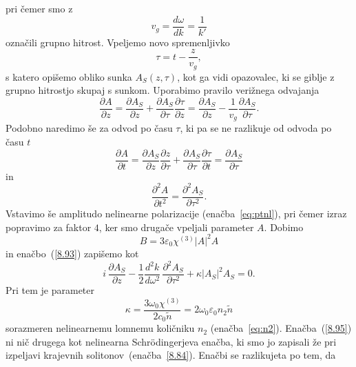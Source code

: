 pri čemer smo z 
\begin{equation}
 v_g = \frac{d\omega}{dk} = \frac{1}{k'}
\end{equation}
označili grupno hitrost.
Vpeljemo novo spremenljivko 
\begin{equation}
\tau=t-\frac{z}{v_{g}},
\label{nelinver}
\end{equation}
s katero opišemo obliko sunka $A_S(z,\tau)$, kot ga vidi opazovalec, ki se giblje
z grupno hitrostjo skupaj s sunkom. Uporabimo pravilo verižnega odvajanja 
\begin{equation}
\frac{\partial A}{\partial z} = \frac{\partial A_S}{\partial z} + \frac{\partial A_S}{\partial \tau}
\frac{\partial \tau}{\partial z}
= \frac{\partial A_S}{\partial z} -\frac{1}{v_g} \frac{\partial A_S}{\partial \tau}.
\end{equation}
Podobno naredimo še za odvod po času $\tau$, ki pa se ne razlikuje od odvoda po času $t$
\begin{equation}
\frac{\partial A}{\partial t} = \frac{\partial A_S}{\partial z}\frac{\partial z}{\partial \tau}+
\frac{\partial A_S}{\partial \tau}\frac{\partial \tau}{\partial t} 
= \frac{\partial A_S}{\partial \tau} 
\end{equation}
in
\begin{equation}
\frac{\partial^2 A}{\partial t^2} = \frac{\partial^2 A_S}{\partial\tau^2}.
\end{equation}
Vstavimo še amplitudo nelinearne polarizacije (enačba~\ref{eq:ptnl}), pri čemer izraz popravimo
za faktor $4$, ker smo drugače vpeljali parameter $A$. Dobimo
\begin{equation}
B = 3\varepsilon_0\chi^{(3)} |A|^2 A
\end{equation}
in enačbo~(\ref{8.93}) zapišemo kot 
\begin{equation}
i\,\frac{\partial A_S}{\partial z}-\frac{1}{2}\frac{d^{2}k}{d\omega^{2}}\,
\frac{\partial^{2}A_S}{\partial\tau^{2}}+\kappa\left|A_S\right|^{2}A_S=0.
\label{8.95}
\end{equation}
Pri tem je parameter
\begin{equation}
\kappa = \frac{3\omega_0\chi^{(3)}}{2c_0 \tilde{n}} = 2 \omega_0 \varepsilon_0 n_2 \tilde{n}
\end{equation}
sorazmeren nelinearnemu lomnemu količniku $n_2$ 
(enačba~\ref{eq:n2}). Enačba~(\ref{8.95}) ni nič drugega kot nelinearna Schr\"odingerjeva 
enačba, ki smo jo 
zapisali že pri izpeljavi krajevnih solitonov~(enačba~\ref{8.84}). Enačbi se razlikujeta po tem, da
